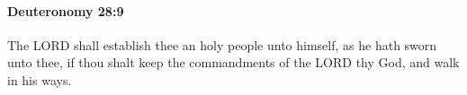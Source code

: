 
		\paragraph{Deuteronomy 28:9} %
			\label{DEUTERONOMY-28-9}

			The LORD shall establish thee an holy people unto himself, as he hath sworn unto thee, if thou shalt keep the commandments of the LORD thy God, and walk in his ways.


